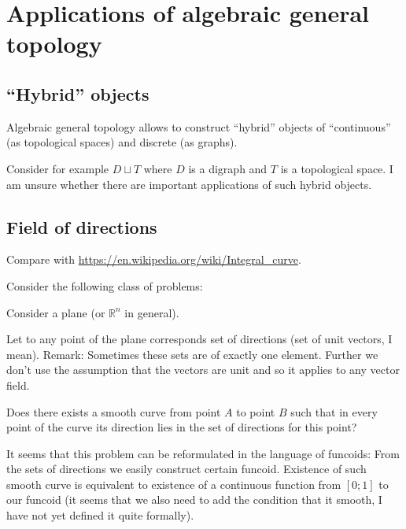\chapter{Applications of algebraic general topology}


\section{``Hybrid'' objects}

Algebraic general topology allows to construct ``hybrid'' objects of ``continuous'' (as topological spaces)
and discrete (as graphs).

Consider for example $D\sqcup T$ where $D$ is a digraph and $T$ is a topological space.
I am unsure whether there are important applications of such hybrid objects.

\section{Field of directions}


Compare with \url{https://en.wikipedia.org/wiki/Integral_curve}.

Consider the following class of problems:

Consider a plane (or $\mathbb{R}^n$ in general).

Let to any point of the plane corresponds set of directions (set of unit vectors, I mean).
Remark: Sometimes these sets are of exactly one element. Further we
don't use the assumption that the vectors are unit and so it applies to any vector field.

Does there exists a smooth curve from point $A$ to point $B$ such that in every point of the curve its direction lies in the set of directions for this point?

It seems that this problem can be reformulated in the language of funcoids: From the sets of directions we easily construct certain funcoid.
Existence of such smooth curve is equivalent to existence of a continuous function from $[0;1]$ to our funcoid (it seems that we also need to add the
condition that it smooth, I have not yet defined it quite formally).

